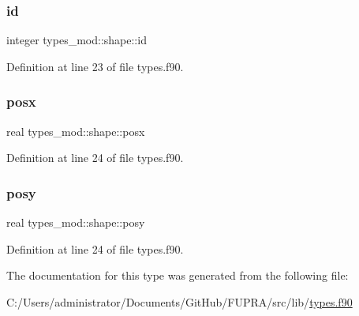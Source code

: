 \subsubsection{\texorpdfstring{id}{id}}
{\footnotesize\ttfamily integer types\+\_\+mod\+::shape\+::id\hspace{0.3cm}{\ttfamily [private]}}



Definition at line 23 of file types.\+f90.

\mbox{\label{structtypes__mod_1_1shape_a85cc6141bd06372d74cca0ab698a90cb}} 
\subsubsection{\texorpdfstring{posx}{posx}}
{\footnotesize\ttfamily real types\+\_\+mod\+::shape\+::posx\hspace{0.3cm}{\ttfamily [private]}}



Definition at line 24 of file types.\+f90.

\mbox{\label{structtypes__mod_1_1shape_a0eadb644d5bf6cc0bdc1b966f7e7080e}} 
\subsubsection{\texorpdfstring{posy}{posy}}
{\footnotesize\ttfamily real types\+\_\+mod\+::shape\+::posy\hspace{0.3cm}{\ttfamily [private]}}



Definition at line 24 of file types.\+f90.



The documentation for this type was generated from the following file\+:\begin{DoxyCompactItemize}
\item 
C\+:/\+Users/administrator/\+Documents/\+Git\+Hub/\+F\+U\+P\+R\+A/src/lib/\hyperlink{types_8f90}{types.\+f90}\end{DoxyCompactItemize}
